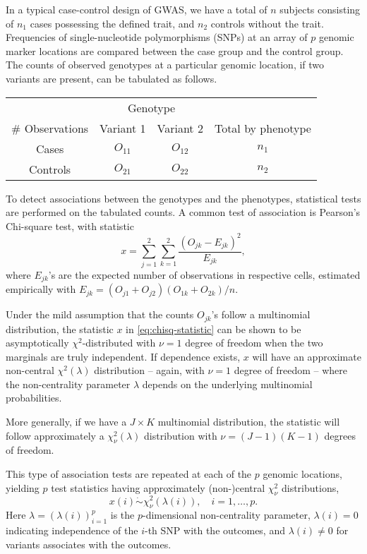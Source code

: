 In a typical case-control design of GWAS, we have a total of $n$ subjects consisting of $n_1$ cases possessing the defined trait, and $n_2$ controls without the trait.
Frequencies of single-nucleotide polymorphisms (SNPs) at an array of $p$ genomic marker locations are compared between the case group and the control group.
The counts of observed genotypes at a particular genomic location, if two variants are present, can be tabulated as follows.
\begin{center}
    \begin{tabular}{cccc}
    \hline
    & \multicolumn{2}{c}{Genotype} & \\
    \cline{2-3}
    \# Observations & Variant 1 & Variant 2 & Total by phenotype \\
    \hline
    Cases & $O_{11}$ & $O_{12}$ & $n_1$ \\
    Controls & $O_{21}$ & $O_{22}$ & $n_2$ \\
    \hline
    \end{tabular}
\end{center}
To detect associations between the genotypes and the phenotypes, statistical tests are performed on the tabulated counts.
A common test of association is Pearson's Chi-square test, with statistic
\begin{equation} \label{eq:chisq-statistic}
    x = \sum_{j=1}^2 \sum_{k=1}^2 \frac{(O_{jk} - E_{jk})^2}{E_{jk}},
\end{equation}
where $E_{jk}$'s are the expected number of observations in respective cells, estimated empirically with $E_{jk} = (O_{j1}+O_{j2})(O_{1k}+O_{2k})/n$.

Under the mild assumption that the counts $O_{jk}$'s follow a multinomial distribution, the statistic $x$ in \eqref{eq:chisq-statistic} can be shown to be asymptotically $\chi^2$-distributed with $\nu=1$ degree of freedom when the two marginals are truly independent.
If dependence exists, $x$ will have an approximate non-central $\chi^2(\lambda)$ distribution -- again, with $\nu=1$ degree of freedom -- where the non-centrality parameter $\lambda$ depends on the underlying multinomial probabilities.

More generally, if we have a $J\times K$ multinomial distribution, the statistic will follow approximately a $\chi^2_{\nu}(\lambda)$ distribution with $\nu = (J-1)(K-1)$ degrees of freedom.

This type of association tests are repeated at each of the $p$ genomic locations, yielding $p$ test statistics having approximately (non-)central $\chi^2_{\nu}$ distributions,
\begin{equation} \label{eq:model-chisquare-approx}
    x(i) \mathrel{\dot\sim} \chi_\nu^2\left(\lambda(i)\right), \quad i=1,\ldots,p.
\end{equation}
Here $\lambda = (\lambda(i))_{i=1}^p$ is the $p$-dimensional non-centrality parameter, $\lambda(i)=0$ indicating independence of the $i$-th SNP with the outcomes, and $\lambda(i)\neq0$ for variants associates with the outcomes.

